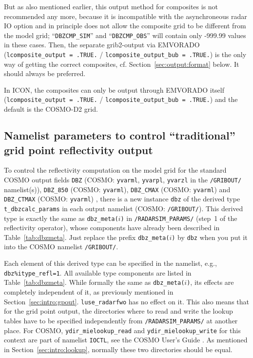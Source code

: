 \documentclass[10pt,a4paper,twoside,headinclude,footinclude,parskip=half]{scrartcl}
\newcommand{\myaktuellesection}{sec:intro}%
\newcommand{\labelsec}[1]{\label{#1}\renewcommand{\myaktuellesection}{#1}}%
\newcommand{\labelsec}[1]{\label{#1}}%
\newcommand{\srcform}[1]{\mbox{\texttt{#1}}\xspace}%
\begin{document}
But as also mentioned earlier, this output method for composites is not recommended any more, because it is
incompatible with the asynchroneous radar IO option and in principle does not allow the composite grid to be
different from the model grid; ``\srcform{DBZCMP_SIM}'' and ``\srcform{DBZCMP_OBS}'' will contain
only -999.99 values in these cases. Then, the separate grib2-output via EMVORADO (\srcform{lcomposite_output = .TRUE.} / \srcform{lcomposite_output_bub = .TRUE.})
is the only way of getting the correct composites, cf. Section~\ref{sec:output:format} below.
It should always be preferred.

In ICON, the composites can only be output through EMVORADO itself (\srcform{lcomposite_output = .TRUE.} / \srcform{lcomposite_output_bub = .TRUE.}) and the default is the COSMO-D2 grid.


\newpage


\subsection{Namelist parameters to control ``traditional'' grid point reflectivity output}

\labelsec{sec:nml:gpout}

To control the reflectivity computation on the model grid for the standard
COSMO output fields \srcform{DBZ} (COSMO: \srcform{yvarml}, \srcform{yvarpl}, \srcform{yvarzl} in the \srcform{/GRIBOUT/} namelist(s)), \srcform{DBZ_850} (COSMO: \srcform{yvarml}), \srcform{DBZ_CMAX} (COSMO: \srcform{yvarml}) and \srcform{DBZ_CTMAX} (COSMO: \srcform{yvarml})
, there is a new instance \srcform{dbz} of the derived type \srcform{t_dbzcalc_params} in each output namelist (COSMO: \srcform{/GRIBOUT/}). This derived type is exactly the same
as \srcform{dbz_meta($i$)} in \srcform{/RADARSIM_PARAMS/} (step~1 of the reflectivity operator), whose components have already been described in Table~\ref{tab:dbzmeta}.
Just replace the prefix \srcform{dbz_meta($i$)} by \srcform{dbz} when you put it into the COSMO namelist  \srcform{/GRIBOUT/}.

Each element of this derived type can be specified in the namelist, e.g., \srcform{dbz\%itype_refl=1}.
All available type components are listed in Table~\ref{tab:dbzmeta}. While formally the same as \srcform{dbz_meta($i$)},
its effects are completely independent of it, as previously mentioned in Section~\ref{sec:intro:gpout}. \srcform{luse_radarfwo} has no effect on it.
This also means that for the grid point output, the directories where to read and write the lookup tables have to be specified independently
from \srcform{/RADARSIM_PARAMS/} at another place. For COSMO, \srcform{ydir_mielookup_read} and \srcform{ydir_mielookup_write} for this context
are part of namelist \srcform{IOCTL}, see the COSMO User's Guide \citep{schaettler2018}.
As mentioned in Section~\ref{sec:intro:lookup}, normally these two directories should be equal.
\end{document}
